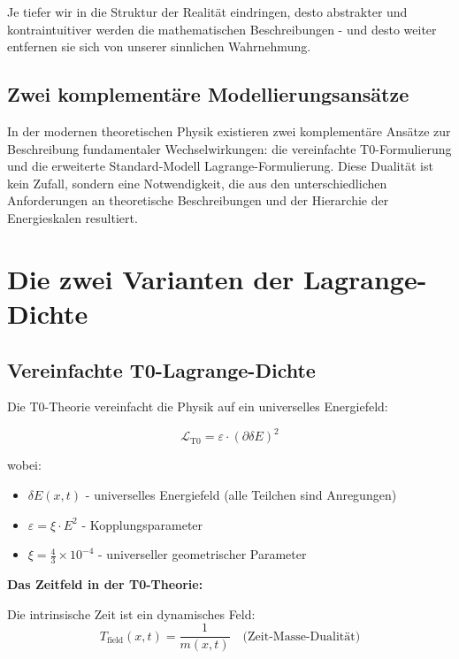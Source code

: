 	Je tiefer wir in die Struktur der Realität eindringen, desto abstrakter und kontraintuitiver werden die mathematischen Beschreibungen - und desto weiter entfernen sie sich von unserer sinnlichen Wahrnehmung.
	
	\subsection{Zwei komplementäre Modellierungsansätze}
	
	In der modernen theoretischen Physik existieren zwei komplementäre Ansätze zur Beschreibung fundamentaler Wechselwirkungen: die vereinfachte T0-Formulierung und die erweiterte Standard-Modell Lagrange-Formulierung. Diese Dualität ist kein Zufall, sondern eine Notwendigkeit, die aus den unterschiedlichen Anforderungen an theoretische Beschreibungen und der Hierarchie der Energieskalen resultiert.
	
	\section{Die zwei Varianten der Lagrange-Dichte}
	
	\subsection{Vereinfachte T0-Lagrange-Dichte}
	
	Die T0-Theorie vereinfacht die Physik auf ein universelles Energiefeld:
	
	\begin{t0box}
		\begin{equation}
			\mathcal{L}_{\text{T0}} = \varepsilon \cdot (\partial\delta E)^2
		\end{equation}
		
		wobei:
		\begin{itemize}
			\item $\delta E(x,t)$ - universelles Energiefeld (alle Teilchen sind Anregungen)
			\item $\varepsilon = \xi \cdot E^2$ - Kopplungsparameter
			\item $\xi = \frac{4}{3} \times 10^{-4}$ - universeller geometrischer Parameter
		\end{itemize}
	\end{t0box}
	
	\textbf{Das Zeitfeld in der T0-Theorie:}
	
	Die intrinsische Zeit ist ein dynamisches Feld:
	\begin{equation}
		T_{\text{field}}(x,t) = \frac{1}{m(x,t)} \quad \text{(Zeit-Masse-Dualität)}
	\end{equation}
	
